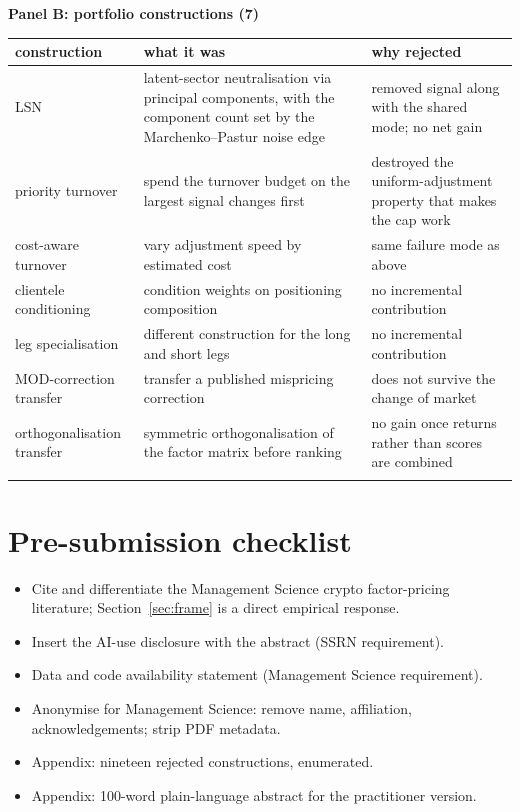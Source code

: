 \documentclass[11pt,letterpaper]{article}
\begin{document}
\newpage
\small
\noindent\textbf{Panel B: portfolio constructions (7)}
\vspace{3pt}
\begin{longtable}{p{}p{}p{}}
\toprule\addlinespace[2pt]
construction & what it was & why rejected \\
\midrule\addlinespace[2pt]
\endhead
LSN & latent-sector neutralisation via principal components, with the component count set by the Marchenko--Pastur noise edge & removed signal along with the shared mode; no net gain \\
priority turnover & spend the turnover budget on the largest signal changes first & destroyed the uniform-adjustment property that makes the cap work \\
cost-aware turnover & vary adjustment speed by estimated cost & same failure mode as above \\
clientele conditioning & condition weights on positioning composition & no incremental contribution \\
leg specialisation & different construction for the long and short legs & no incremental contribution \\
MOD-correction transfer & transfer a published mispricing correction & does not survive the change of market \\
orthogonalisation transfer & symmetric orthogonalisation of the factor matrix before ranking & no gain once returns rather than scores are combined \\
\addlinespace[2pt]
\bottomrule
\end{longtable}
\normalsize

\newpage
\section*{Pre-submission checklist}
\begin{itemize}\itemsep2pt
\item Cite and differentiate the Management Science crypto factor-pricing
literature; Section~\ref{sec:frame} is a direct empirical response.
\item Insert the AI-use disclosure with the abstract (SSRN requirement).
\item Data and code availability statement (Management Science requirement).
\item Anonymise for Management Science: remove name, affiliation,
acknowledgements; strip PDF metadata.
\item Appendix: nineteen rejected constructions, enumerated.
\item Appendix: 100-word plain-language abstract for the practitioner version.
\end{itemize}
\end{document}
